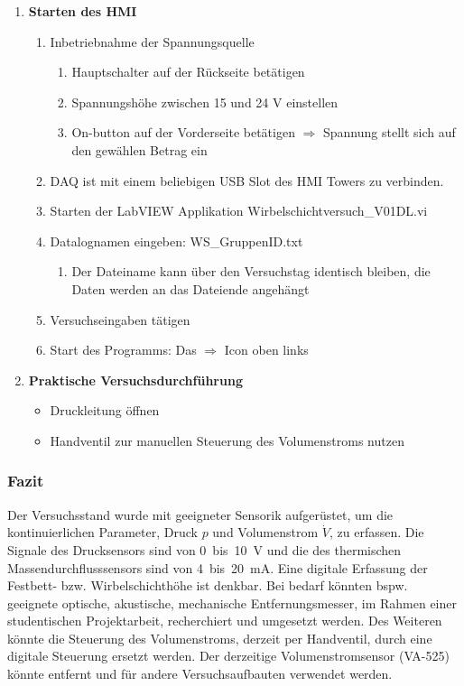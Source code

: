 \begin{enumerate}
\item \textbf{{\Hypatia Starten des HMI}}
	\begin{enumerate}[label = \Roman*, itemsep = -.1em]
		\item Inbetriebnahme der Spannungsquelle
			\begin{enumerate}[label = \roman*, itemsep = -.1em]
			\item Hauptschalter auf der Rückseite betätigen
			\item Spannungshöhe zwischen 15 und 24 V einstellen
			\item On-button auf der Vorderseite betätigen $\Rightarrow$ Spannung stellt sich auf den gewählen Betrag ein
			\end{enumerate}	
			
	\item DAQ ist mit einem beliebigen USB Slot des HMI Towers zu verbinden.
	\item Starten der LabVIEW Applikation {\Menlo Wirbelschichtversuch\_V01DL.vi}
	\item Datalognamen eingeben: WS\_{\Menlo GruppenID.txt}
	
		\begin{enumerate}[label = -, itemsep = -.1em]
		\item Der Dateiname kann über den Versuchstag identisch bleiben, die Daten werden an das Dateiende angehängt
		\end{enumerate}
	\item Versuchseingaben tätigen
	\item Start des Programms: Das $\Rightarrow$ Icon oben links 
	
\end{enumerate}
\item \textbf{{\Hypatia Praktische Versuchsdurchführung }}
\begin{itemize}
\item Druckleitung öffnen
\item Handventil zur manuellen Steuerung des Volumenstroms nutzen
\end{itemize}
\end{enumerate}

\subsubsection{Fazit}

Der Versuchsstand wurde mit geeigneter Sensorik aufgerüstet, um die kontinuierlichen Parameter, Druck $p$ und Volumenstrom $\dot{V}$, zu erfassen. Die Signale des Drucksensors sind von 0~bis~10~V und die des thermischen Massendurchflusssensors sind von 4~bis~20~mA. Eine digitale Erfassung der Festbett- bzw. Wirbelschichthöhe ist denkbar. Bei bedarf könnten bspw. geeignete optische, akustische, mechanische Entfernungsmesser, im Rahmen einer studentischen Projektarbeit, recherchiert und umgesetzt werden. Des Weiteren könnte die Steuerung des Volumenstroms, derzeit per Handventil, durch eine digitale Steuerung ersetzt werden. Der derzeitige Volumenstromsensor (VA-525) könnte entfernt und für andere Versuchsaufbauten verwendet werden.
\pagebreak


